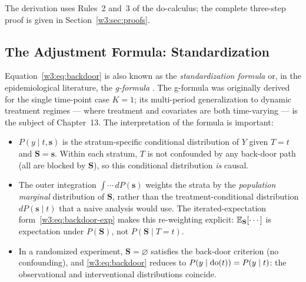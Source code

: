\documentclass[master.tex]{subfiles}
\begin{document}
The derivation uses Rules~2 and~3 of the do-calculus; the complete
three-step proof is given in Section~\ref{w3:sec:proofs}.

\subsection{The Adjustment Formula: Standardization}
\label{w3:sec:standardization}
Equation~\eqref{w3:eq:backdoor} is also known as the \emph{standardization
formula} or, in the epidemiological literature, the \emph{g-formula}
\citep{robins1986new}.  The g-formula was originally derived for the single
time-point case $K=1$; its multi-period generalization to dynamic treatment
regimes --- where treatment and covariates are both time-varying --- is the
subject of Chapter~13.  The interpretation of the formula is important:

\begin{itemize}
  \item $P(y \mid t, \mathbf{s})$ is the stratum-specific conditional
        distribution of $Y$ given $T{=}t$ and $\mathbf{S}{=}\mathbf{s}$.
        Within each stratum, $T$ is not confounded by any back-door path
        (all are blocked by $\mathbf{S}$), so this conditional distribution
        \emph{is} causal.
  \item The outer integration $\int \cdots\, dP(\mathbf{s})$ weights the
        strata by the \emph{population marginal} distribution of
        $\mathbf{S}$, rather than the treatment-conditional distribution
        $dP(\mathbf{s} \mid t)$ that a naive analysis would use.  The
        iterated-expectation form~\eqref{w3:eq:backdoor-exp} makes this
        re-weighting explicit: $\mathbb{E}_{\mathbf{S}}[\cdots]$ is expectation
        under $P(\mathbf{S})$, not $P(\mathbf{S} \mid T{=}t)$.
  \item In a randomized experiment, $\mathbf{S} = \varnothing$ satisfies
        the back-door criterion (no confounding), and
        \eqref{w3:eq:backdoor} reduces to $P(y \mid \mathrm{do}(t)) = P(y \mid t)$:
        the observational and interventional distributions coincide.
\end{itemize}
\end{document}
